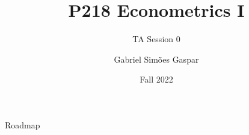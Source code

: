 \documentclass[10pt, xcolor=dvipsnames,compress]{beamer}
\title{P218 Econometrics I}
\subtitle{TA Session 0}
\author{Gabriel Simões Gaspar}
\institute{London Business School}
\date{Fall 2022}
\begin{document}
\maketitle

\begin{frame}{Roadmap}
    \tableofcontents
\end{frame}







\end{document}

